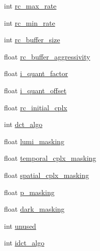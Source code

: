 \begin{DoxyCompactItemize}
int \hyperlink{struct_tao_1_1_f_fmpeg_1_1_f_fmpeg_1_1_a_v_codec_context_ae6226709a20212d9e0485919b3c87ccf}{rc\_\-max\_\-rate}
\item 
int \hyperlink{struct_tao_1_1_f_fmpeg_1_1_f_fmpeg_1_1_a_v_codec_context_a2c4a8c07305ee7267255e84aab51e5fd}{rc\_\-min\_\-rate}
\item 
int \hyperlink{struct_tao_1_1_f_fmpeg_1_1_f_fmpeg_1_1_a_v_codec_context_aac210f61060313b8a718b990f5b8bafb}{rc\_\-buffer\_\-size}
\item 
float \hyperlink{struct_tao_1_1_f_fmpeg_1_1_f_fmpeg_1_1_a_v_codec_context_a7631cca143125cb09c2e3b6c63ee8ce3}{rc\_\-buffer\_\-aggressivity}
\item 
float \hyperlink{struct_tao_1_1_f_fmpeg_1_1_f_fmpeg_1_1_a_v_codec_context_a364d0f8292812d2b3a32f7abcb828801}{i\_\-quant\_\-factor}
\item 
float \hyperlink{struct_tao_1_1_f_fmpeg_1_1_f_fmpeg_1_1_a_v_codec_context_acb11ab2c791025ac9361781957c3bd78}{i\_\-quant\_\-offset}
\item 
float \hyperlink{struct_tao_1_1_f_fmpeg_1_1_f_fmpeg_1_1_a_v_codec_context_a105a5045ac9e2d73bbc4e8c63a384542}{rc\_\-initial\_\-cplx}
\item 
int \hyperlink{struct_tao_1_1_f_fmpeg_1_1_f_fmpeg_1_1_a_v_codec_context_afabb7149cf6dd133f2c4a3bcd45d1174}{dct\_\-algo}
\item 
float \hyperlink{struct_tao_1_1_f_fmpeg_1_1_f_fmpeg_1_1_a_v_codec_context_a0540e23adeac7fbe6dab0166868da0cd}{lumi\_\-masking}
\item 
float \hyperlink{struct_tao_1_1_f_fmpeg_1_1_f_fmpeg_1_1_a_v_codec_context_aaf4222eed20204ba5b450e84a2b42ed8}{temporal\_\-cplx\_\-masking}
\item 
float \hyperlink{struct_tao_1_1_f_fmpeg_1_1_f_fmpeg_1_1_a_v_codec_context_a33185321e98df9e22fd3b99e9648fdb9}{spatial\_\-cplx\_\-masking}
\item 
float \hyperlink{struct_tao_1_1_f_fmpeg_1_1_f_fmpeg_1_1_a_v_codec_context_aef8a2bdbe812842fb2035c13ce41ed21}{p\_\-masking}
\item 
float \hyperlink{struct_tao_1_1_f_fmpeg_1_1_f_fmpeg_1_1_a_v_codec_context_ae2910a7716be916f36f898b38792ff63}{dark\_\-masking}
\item 
int \hyperlink{struct_tao_1_1_f_fmpeg_1_1_f_fmpeg_1_1_a_v_codec_context_a68796abd8c0dd3eb4036b1f91dccd39a}{unused}
\item 
int \hyperlink{struct_tao_1_1_f_fmpeg_1_1_f_fmpeg_1_1_a_v_codec_context_ae786ce9ce0b202fda584e087b7e054e1}{idct\_\-algo}
\item 

\end{DoxyCompactItemize}
